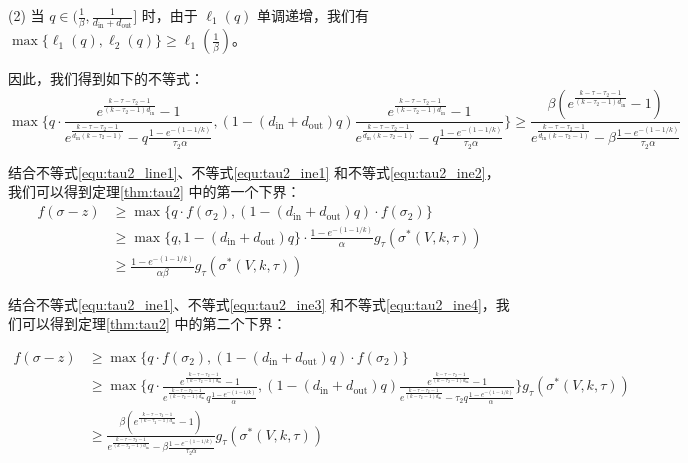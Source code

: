 (2) 当 $q \in (\frac{1}{\beta},\frac{1}{d_{\text{in}}+d_{\text{out}}}]$ 时，由于 $\ell_1(q)$ 单调递增，我们有 $\max\{\ell_1(q),\ell_2(q)\}\ge \ell_1(\frac{1}{\beta})$。

因此，我们得到如下的不等式：
\begin{equation}
\max\{ q \cdot \frac{e^{\frac{k-\tau-\tau_2-1}{(k-\tau_2-1)d_{\text{in}}}}-1}{e^{\frac{k-\tau-\tau_2-1}
{d_{\text{in}}(k-\tau_2-1)}}-q \frac{1-e^{-(1-1/k)}}{\tau_2\alpha} } , (1-(d_{\text{in}} + d_{\text{out}})q) \frac{e^{\frac{k-\tau-\tau_2-1}{(k-\tau_2-1)d_{\text{in}}}}-1}{e^{\frac{k-\tau-\tau_2-1}
{d_{\text{in}}(k-\tau_2-1)}}-q \frac{1-e^{-(1-1/k)}}{\tau_2\alpha} } \} \ge
\frac{\beta(e^{\frac{k-\tau-\tau_2-1}{(k-\tau_2-1)d_{\text{in}}}}-1)}{e^{\frac{k-\tau-\tau_2-1}
{d_{\text{in}}(k-\tau_2-1)}}-\beta \frac{1-e^{-(1-1/k)}}{\tau_2\alpha} } \label{equ:tau2_ine4}
\end{equation}

结合不等式\ref{equ:tau2_line1}、不等式\ref{equ:tau2_ine1} 和不等式\ref{equ:tau2_ine2}，我们可以得到定理\ref{thm:tau2} 中的第一个下界：
\begin{align}
f(\sigma -z ) & \ge \max\{ q \cdot f(\sigma_2),(1-(d_{\text{in}} + d_{\text{out}})q) \cdot f(\sigma_2)\} \\
& \ge \max\{q,1-(d_{\text{in}} + d_{\text{out}})q\} \cdot \frac{1-e^{-(1-1/k)}}{\alpha} g_\tau(\sigma^*(V,k,\tau)) \\
& \ge \frac{1-e^{-(1-1/k)}}{\alpha\beta} g_\tau(\sigma^*(V,k,\tau))
\end{align}

结合不等式\ref{equ:tau2_ine1}、不等式\ref{equ:tau2_ine3} 和不等式\ref{equ:tau2_ine4}，我们可以得到定理\ref{thm:tau2} 中的第二个下界：

\begin{align}
f(\sigma -z ) & \ge \max\{ q \cdot f(\sigma_2),(1-(d_{\text{in}} + d_{\text{out}})q) \cdot f(\sigma_2)\} \\
& \ge \max\{ q \cdot \frac{e^{\frac{k-\tau-\tau_2-1}{(k-\tau_2-1)d_{\text{in}}}}-1}{e^{\frac{k-\tau-\tau_2-1}{(k-\tau_2-1)d_{\text{in}}}} q \frac{1-e^{-(1-1/k)}}{\alpha} } , (1-(d_{\text{in}} + d_{\text{out}})q) \frac{e^{\frac{k-\tau-\tau_2-1}{(k-\tau_2-1)d_{\text{in}}}}-1}{e^{\frac{k-\tau-\tau_2-1}{(k-\tau_2-1)d_{\text{in}}}}-\tau_2 q \frac{1-e^{-(1-1/k)}}{\alpha} } \} g_\tau(\sigma^*(V,k,\tau)) \\
& \ge \frac{\beta(e^{\frac{k-\tau-\tau_2-1}{(k-\tau_2-1)d_{\text{in}}}}-1)}{e^{\frac{k-\tau-\tau_2-1}{(k-\tau_2-1)d_{\text{in}}}}- \beta \frac{1-e^{-(1-1/k)}}{\tau_2\alpha} } g_\tau(\sigma^*(V,k,\tau))
\end{align}

